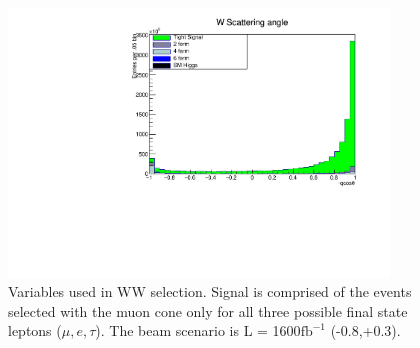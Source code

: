 \begin{figure}
\begin{minipage}{0.49\textwidth}
    \end{minipage}\hfill
    \begin{minipage}{0.49\textwidth}
        \centering
        \includegraphics[width=0.9\textwidth]{qcostHist.pdf} %
        
     \end{minipage}
          \caption{ Variables used in WW selection. Signal is comprised of the events selected with the muon cone only for all three possible final state leptons ($\mu,e,\tau$).  The beam scenario is L = 1600$\text{fb}^{-1}$ (-0.8,+0.3).}
          \label{fig:stacks1}
\end{figure}